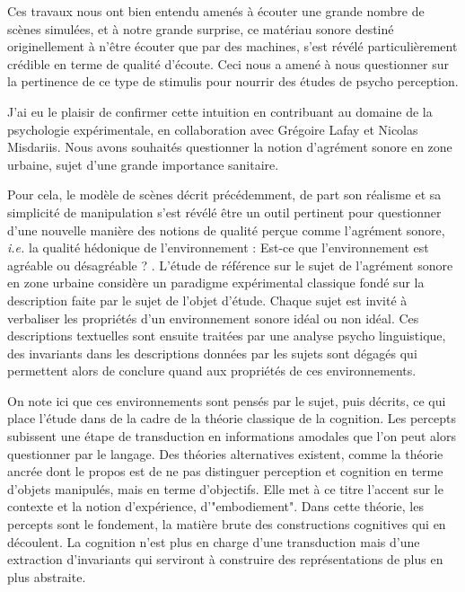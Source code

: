   Ces travaux nous ont bien entendu amenés à écouter une grande nombre de scènes simulées, et à notre grande surprise, ce matériau sonore destiné originellement à n'être écouter que par des machines, s'est révélé particulièrement crédible en terme de qualité d'écoute. Ceci nous a amené à nous questionner sur la pertinence de ce type de stimulis pour nourrir des études de psycho perception.

  J'ai eu le plaisir de confirmer cette intuition en contribuant au domaine de la psychologie expérimentale, en collaboration avec Grégoire Lafay et Nicolas Misdariis. Nous avons souhaités questionner la notion d'agrément sonore en zone urbaine, sujet d'une grande importance sanitaire.

  Pour cela, le modèle de scènes décrit précédemment, de part son réalisme et sa simplicité de manipulation s'est révélé être un outil pertinent pour questionner d'une nouvelle manière des notions de qualité perçue comme l'agrément sonore, \textit{i.e.} la qualité hédonique de l’environnement : \og Est-ce que l’environnement est agréable ou désagréable ? \fg. L'étude de référence sur le sujet de l'agrément sonore en zone urbaine\cite{guastavino2006ideal} considère un paradigme expérimental classique fondé sur la description faite par le sujet de l'objet d'étude. Chaque sujet est invité à verbaliser les propriétés d'un environnement sonore idéal ou non idéal. Ces descriptions textuelles sont ensuite traitées par une analyse psycho linguistique, des invariants dans les descriptions données par les sujets sont dégagés qui permettent alors de conclure quand aux propriétés de ces environnements.

  On note ici que ces environnements sont pensés par le sujet, puis décrits, ce qui place l'étude dans de la cadre de la théorie classique de la cognition. Les percepts subissent une étape de transduction en informations amodales que l'on peut alors questionner par le langage. Des théories alternatives existent, comme la théorie ancrée\cite{barsalou2010grounded} dont le propos est de ne pas distinguer perception et cognition en terme d'objets manipulés, mais en terme d'objectifs. Elle met à ce titre l'accent sur le contexte et la notion d'expérience, d'"embodiement". Dans cette théorie, les percepts sont le fondement, la matière brute des constructions cognitives qui en découlent. La cognition n'est plus en charge d'une transduction mais d'une extraction d'invariants qui serviront à construire des représentations de plus en plus abstraite.

